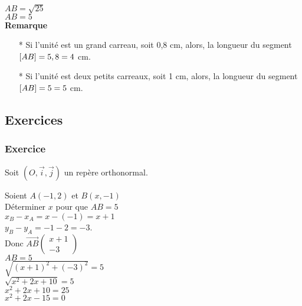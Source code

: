$ AB = \sqrt{25} $\\

$ AB = 5 $\\

\textbf{Remarque}

\begin{itemize}
\item[*] Si l'unité est un grand carreau, soit 0,8 cm, alors, la longueur du segment $\left[AB\right] = 5 \time 0,8 = 4 $ cm.
\item[*] Si l'unité est deux petits carreaux, soit 1 cm, alors, la longueur du segment $\left[AB\right] = 5 \time 1 = 5 $ cm.
\end{itemize}

\newpage
\subsection{Exercices}

\subsubsection{Exercice }

Soit $\left(O, \vec{i}, \vec{j}\right)$ un repère orthonormal.

Soient $A\left(-1,2\right)$ et $B\left(x,-1\right)$\\

Déterminer $x$ pour que $AB = 5$\\

$x_B - x_A = x - \left(-1\right) = x + 1 $\\

$ y_B - y_A = -1 - 2 = -3$. \\

Donc $\overrightarrow{AB}\left(\begin{array}{c} x+1\\ -3 \end{array}\right)$ \\

$ AB = 5 $\\

$ \sqrt{\left(x+1\right)^2 + \left(-3\right)^2} = 5 $\\

$ \sqrt{x^2 + 2x + 10} = 5 $\\

$ x^2 + 2x + 10 = 25 $\\

$ x^2 + 2x - 15 = 0 $\\

